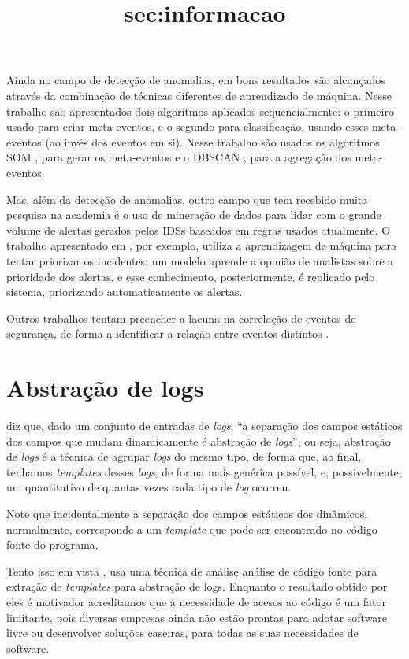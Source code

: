 \documentclass[
	12pt,				%
	openright,			%
	twoside,			%
	a4paper,			%
	english,			%
	spanish,			%
	brazil,				%
	]{abntex2}
\begin{document}
Ainda no campo de detecção de anomalias, em \cite{li2013automatic} bons resultados são alcançados através da combinação de técnicas diferentes de aprendizado de máquina. Nesse trabalho são apresentados dois algoritmos aplicados sequencialmente: o primeiro usado para criar meta-eventos, e o segundo para classificação, usando esses meta-eventos (ao invés dos eventos em si). Nesse trabalho são usados os algoritmos SOM \cite{kohonen1989self}, para gerar os meta-eventos e o DBSCAN \cite{ester1996density}, para a agregação dos meta-eventos.

Mas, além da detecção de anomalias, outro campo que tem recebido muita pesquisa na academia é o uso de mineração de dados para lidar com o grande volume de alertas gerados pelos IDSs baseados em regras usados atualmente. O trabalho apresentado em \cite{zomlot2013aiding}, por exemplo, utiliza a aprendizagem de máquina para tentar priorizar os incidentes: um modelo aprende a opinião de analistas sobre a prioridade dos alertas, e esse conhecimento, posteriormente, é replicado pelo sistema, priorizando automaticamente os alertas.

Outros trabalhos tentam preencher a lacuna na correlação de eventos de segurança, de forma a identificar a relação entre eventos distintos \cite{smith2008using, stroeh2013approach}.

\section{Abstração de logs}\title{sec:informacao}
\cite{nagappan2010abstracting} diz que, dado um conjunto de entradas de \emph{logs}, ``a separação dos campos estáticos dos campos que mudam dinamicamente é abstração de \emph{logs}'', ou seja, abstração de \emph{logs} é a técnica de agrupar \emph{logs} do mesmo tipo, de forma que, ao final, tenhamos \emph{templates} desses \emph{logs}, de forma mais genérica possível, e, possivelmente, um quantitativo de quantas vezes cada tipo de \emph{log} ocorreu.

Note que incidentalmente a separação dos campos estáticos dos dinâmicos, normalmente, corresponde a um \emph{template} que pode ser encontrado no código fonte do programa. 

Tento isso em vista \cite{xu2009detecting}, usa uma técnica de análise análise de código fonte para extração de \emph{templates} para abstração de logs. Enquanto o resultado obtido por eles é motivador acreditamos que a necessidade de acesos ao código é um fator limitante, pois diversas empresas ainda não estão prontas para adotar software livre ou desenvolver soluções caseiras, para todas as suas necessidades de software.
\end{document}
